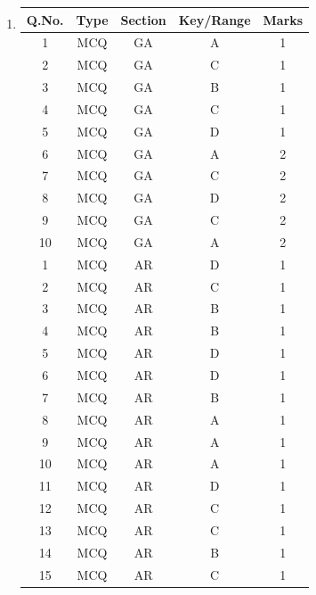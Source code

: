 \documentclass[journal,15pt,onecolumn]{IEEEtran}
\theoremstyle{remark}
\begin{document}
\begin{enumerate}
\renewcommand{\arraystretch}{2.2} %
\setlength{\tabcolsep}{20pt} %
\item
\begin{tabular}{|c|c|c|c|c|}
\hline
\rowcolor{orange!30} %
\textbf{Q.No.} & \textbf{Type} & \textbf{Section} & \textbf{Key/Range} & \textbf{Marks} \\
\hline
1  & MCQ & GA & A & 1 \\ \hline
2  & MCQ & GA & C & 1 \\ \hline
3  & MCQ & GA & B & 1 \\ \hline
4  & MCQ & GA & C & 1 \\ \hline
5  & MCQ & GA & D & 1 \\ \hline
6  & MCQ & GA & A & 2 \\ \hline
7  & MCQ & GA & C & 2 \\ \hline
8  & MCQ & GA & D & 2 \\ \hline
9  & MCQ & GA & C & 2 \\ \hline
10 & MCQ & GA & A & 2 \\ \hline
1  & MCQ & AR & D & 1 \\ \hline
2  & MCQ & AR & C & 1 \\ \hline
3  & MCQ & AR & B & 1 \\ \hline
4  & MCQ & AR & B & 1 \\ \hline
5  & MCQ & AR & D & 1 \\ \hline
6  & MCQ & AR & D & 1 \\ \hline
7  & MCQ & AR & B & 1 \\ \hline
8  & MCQ & AR & A & 1 \\ \hline
9  & MCQ & AR & A & 1 \\ \hline
10 & MCQ & AR & A & 1 \\ \hline
11 & MCQ & AR & D & 1 \\ \hline
12 & MCQ & AR & C & 1 \\ \hline
13 & MCQ & AR & C & 1 \\ \hline
14 & MCQ & AR & B & 1 \\ \hline
15 & MCQ & AR & C & 1 \\ \hline
\end{tabular}
\vspace{1.5cm}



\end{enumerate}
\end{document}
